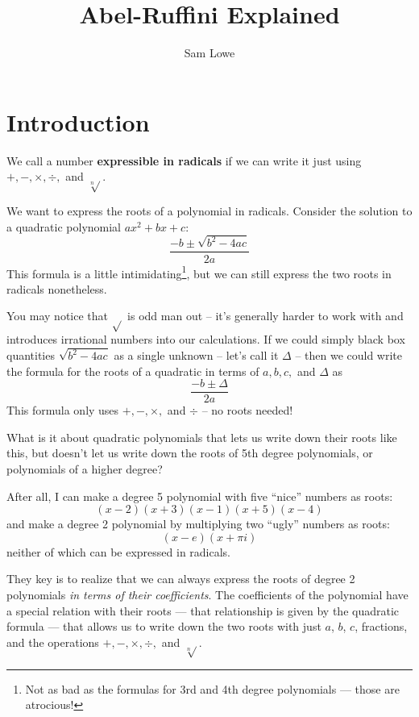 

\title{Abel-Ruffini Explained}
\author{Sam Lowe}



\maketitle

\section{Introduction}

\begin{definition}
    We call a number \textbf{expressible in radicals} if we can write it just using $+, -, \times, \div,$ and $\sqrt[n]{}$.
\end{definition}

We want to express the roots of a polynomial in radicals. Consider the solution to a quadratic polynomial $ax^2 + bx + c$: $$\frac{-b \pm \sqrt{b^2 - 4ac}}{2a}$$ This formula is a little intimidating\footnote{Not as bad as the formulas for 3rd and 4th degree polynomials --- those are atrocious!}, but we can still express the two roots in radicals nonetheless.

You may notice that $\sqrt{}$ is odd man out -- it's generally harder to work with and introduces irrational numbers into our calculations. If we could simply black box quantities $\sqrt{b^2 - 4ac}$ as a single unknown -- let's call it $\Delta$ -- then we could write the formula for the roots of a quadratic in terms of $a, b, c,$ and $\Delta$ as $$\frac{-b \pm \Delta}{2a}$$ This formula only uses $+, -, \times,$ and $\div$ -- no roots needed!

What is it about quadratic polynomials that lets us write down their roots like this, but doesn't let us write down the roots of 5th degree polynomials, or polynomials of a higher degree?

After all, I can make a degree 5 polynomial with five ``nice'' numbers as roots: $$(x-2)(x+3)(x-1)(x+5)(x-4)$$ and make a degree 2 polynomial by multiplying two ``ugly'' numbers as roots: $$(x-e)(x+\pi i)$$ neither of which can be expressed in radicals.

They key is to realize that we can always express the roots of degree 2 polynomials \textit{in terms of their coefficients}. The coefficients of the polynomial have a special relation with their roots --- that relationship is given by the quadratic formula --- that allows us to write down the two roots with just $a$, $b$, $c$, fractions, and the operations $+, -, \times, \div,$ and $\sqrt[n]{}$.

